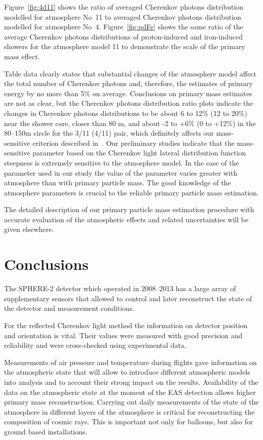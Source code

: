 \documentclass[universe,article,submit,moreauthors,pdftex]{Definitions/mdpi}
\begin{document}
\begin{paracol}{2}
Figure~\ref{fig:4d11} shows the ratio of averaged Cherenkov photons distribution modelled for atmosphere No~11 to averaged Cherenkov photons distribution modelled for atmosphere No~4. Figure~\ref{fig:pdFe} shows the same ratio of the average Cherenkov photons distributions of proton-induced and iron-induced showers for the atmosphere model 11 to demonstrate the scale of the primary mass effect.

Table data clearly states that substantial changes of the atmosphere model affect the total number of Cherenkov photons and, therefore, the estimates of primary energy by no more than 5\% on average. Conclusions on primary mass estimates are not as clear, but the Cherenkov photons distribution ratio plots indicate the changes in Cherenkov photons distributions to be about 6 to 12\% (12 to 20\%) near the shower core, closer than 80 m, and about -2 to +6\% (0 to +12\%) in the 80--150m circle for the 3/11 (4/11) pair, which definitely affects our mass-sensitive criterion described in~\cite{Ant15c}. Our preliminary studies indicate that the mass-sensitive parameter based on the Cherenkov light lateral distribution function steepness is extremely sensitive to the atmosphere model. In the case of the parameter used in our study the value of the parameter varies greater with atmosphere than with primary particle mass. The good knowledge of the atmosphere parameters is crucial to the reliable primary particle mass estimation.

The detailed description of our primary particle mass estimation procedure with accurate evaluation of the atmospheric effects and related uncertainties will be given elsewhere. 



\section{Conclusions \label{sect:conclusions}}
The SPHERE-2 detector which operated in 2008--2013 has a large array of supplementary sensors that allowed to control and later reconstruct the state of the detector and measurement conditions. 

For the reflected Cherenkov light method the information on detector position and orientation is vital. Their values were measured with good precision and reliability and were cross-checked using experimental data.

Measurements of air pressure and temperature during flights gave information on the atmospheric state that will allow to introduce different atmospheric models into analysis and to account their strong impact on the results. Availability of the data on the atmospheric state at the moment of the EAS detection allows higher primary mass reconstruction. Carrying out daily measurements of the state of the atmosphere in different layers of the atmosphere is critical for reconstructing the composition of cosmic rays. This is important not only for balloons, but also for ground based installations.



\end{paracol}
\end{document}
